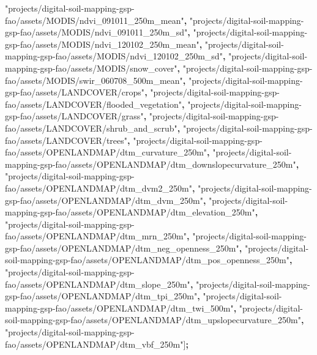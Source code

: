\documentclass[
  10pt,
  b5paper,
  oneside]{book}
\newenvironment{Shaded}{\begin{snugshade}}{\end{snugshade}}
\newcommand{\NormalTok}[1]{#1}
\newcommand{\OperatorTok}[1]{\textcolor[rgb]{0.81,0.36,0.00}{\textbf{#1}}}
\newcommand{\StringTok}[1]{\textcolor[rgb]{0.31,0.60,0.02}{#1}}
\begin{document}
\begin{Shaded}
\begin{Highlighting}[]
\StringTok{"projects/digital{-}soil{-}mapping{-}gsp{-}fao/assets/MODIS/ndvi\_091011\_250m\_mean"}\OperatorTok{,}
\StringTok{"projects/digital{-}soil{-}mapping{-}gsp{-}fao/assets/MODIS/ndvi\_091011\_250m\_sd"}\OperatorTok{,}
\StringTok{"projects/digital{-}soil{-}mapping{-}gsp{-}fao/assets/MODIS/ndvi\_120102\_250m\_mean"}\OperatorTok{,}
\StringTok{"projects/digital{-}soil{-}mapping{-}gsp{-}fao/assets/MODIS/ndvi\_120102\_250m\_sd"}\OperatorTok{,}
\StringTok{"projects/digital{-}soil{-}mapping{-}gsp{-}fao/assets/MODIS/snow\_cover"}\OperatorTok{,}
\StringTok{"projects/digital{-}soil{-}mapping{-}gsp{-}fao/assets/MODIS/swir\_060708\_500m\_mean"}\OperatorTok{,}
\StringTok{"projects/digital{-}soil{-}mapping{-}gsp{-}fao/assets/LANDCOVER/crops"}\OperatorTok{,}
\StringTok{"projects/digital{-}soil{-}mapping{-}gsp{-}fao/assets/LANDCOVER/flooded\_vegetation"}\OperatorTok{,}
\StringTok{"projects/digital{-}soil{-}mapping{-}gsp{-}fao/assets/LANDCOVER/grass"}\OperatorTok{,}
\StringTok{"projects/digital{-}soil{-}mapping{-}gsp{-}fao/assets/LANDCOVER/shrub\_and\_scrub"}\OperatorTok{,}
\StringTok{"projects/digital{-}soil{-}mapping{-}gsp{-}fao/assets/LANDCOVER/trees"}\OperatorTok{,}
\StringTok{"projects/digital{-}soil{-}mapping{-}gsp{-}fao/assets/OPENLANDMAP/dtm\_curvature\_250m"}\OperatorTok{,}
\StringTok{"projects/digital{-}soil{-}mapping{-}gsp{-}fao/assets/OPENLANDMAP/dtm\_downslopecurvature\_250m"}\OperatorTok{,}
\StringTok{"projects/digital{-}soil{-}mapping{-}gsp{-}fao/assets/OPENLANDMAP/dtm\_dvm2\_250m"}\OperatorTok{,}
\StringTok{"projects/digital{-}soil{-}mapping{-}gsp{-}fao/assets/OPENLANDMAP/dtm\_dvm\_250m"}\OperatorTok{,}
\StringTok{"projects/digital{-}soil{-}mapping{-}gsp{-}fao/assets/OPENLANDMAP/dtm\_elevation\_250m"}\OperatorTok{,}
\StringTok{"projects/digital{-}soil{-}mapping{-}gsp{-}fao/assets/OPENLANDMAP/dtm\_mrn\_250m"}\OperatorTok{,}
\StringTok{"projects/digital{-}soil{-}mapping{-}gsp{-}fao/assets/OPENLANDMAP/dtm\_neg\_openness\_250m"}\OperatorTok{,}
\StringTok{"projects/digital{-}soil{-}mapping{-}gsp{-}fao/assets/OPENLANDMAP/dtm\_pos\_openness\_250m"}\OperatorTok{,}
\StringTok{"projects/digital{-}soil{-}mapping{-}gsp{-}fao/assets/OPENLANDMAP/dtm\_slope\_250m"}\OperatorTok{,}
\StringTok{"projects/digital{-}soil{-}mapping{-}gsp{-}fao/assets/OPENLANDMAP/dtm\_tpi\_250m"}\OperatorTok{,}
\StringTok{"projects/digital{-}soil{-}mapping{-}gsp{-}fao/assets/OPENLANDMAP/dtm\_twi\_500m"}\OperatorTok{,}
\StringTok{"projects/digital{-}soil{-}mapping{-}gsp{-}fao/assets/OPENLANDMAP/dtm\_upslopecurvature\_250m"}\OperatorTok{,}
\StringTok{"projects/digital{-}soil{-}mapping{-}gsp{-}fao/assets/OPENLANDMAP/dtm\_vbf\_250m"}\NormalTok{]}\OperatorTok{;}


\end{Highlighting}
\end{Shaded}
\end{document}
